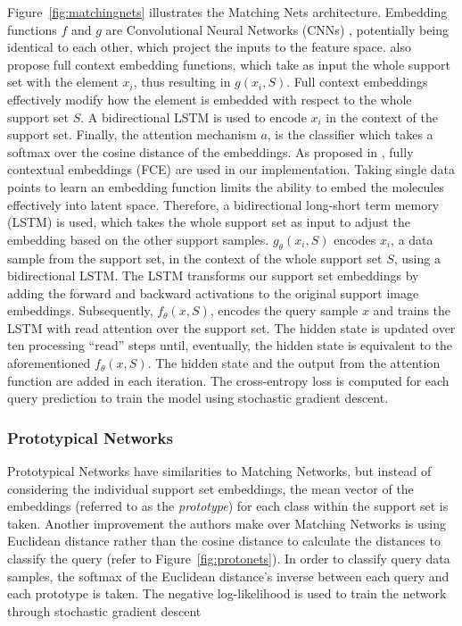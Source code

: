 Figure~\ref{fig:matchingnets} illustrates the Matching Nets architecture. Embedding functions $f$ and $g$ are Convolutional Neural Networks (CNNs) \citep{lecun1995convolutional}, potentially being identical to each other, which project the inputs to the feature space. \citet{vinyals2016matching} also propose full context embedding functions, which take as input the whole support set with the element $x_i$, thus resulting in \( g(x_i, S) \). Full context embeddings effectively modify how the element is embedded with respect to the whole support set $S$. A bidirectional LSTM is used to encode $x_i$ in the context of the support set. Finally, the attention mechanism $a$, is the classifier which takes a softmax over the cosine distance of the embeddings. As proposed in \citet{vinyals2016matching}, fully contextual embeddings (FCE) are used in our implementation. Taking single data points to learn an embedding function limits the ability to embed the molecules effectively into latent space. Therefore, a bidirectional long-short term memory (LSTM) is used, which takes the whole support set as input to adjust the embedding based on the other support samples. $g_\theta(x_i, S)$ encodes $x_i$, a data sample from the support set, in the context of the whole support set $S$, using a bidirectional LSTM. The LSTM transforms our support set embeddings by adding the forward and backward activations to the original support image embeddings. Subsequently, $f_\theta(x, S)$, encodes the query sample $x$ and trains the LSTM with read attention over the support set. The hidden state is updated over ten processing ``read'' steps until, eventually, the hidden state is equivalent to the aforementioned $f_\theta(x, S)$. The hidden state and the output from the attention function are added in each iteration. The cross-entropy loss is computed for each query prediction to train the model using stochastic gradient descent.

\subsubsection{Prototypical Networks}

Prototypical Networks \citep{snell2017prototypical} have similarities to Matching Networks, but instead of considering the individual support set embeddings, the mean vector of the embeddings (referred to as the \textit{prototype}) for each class within the support set is taken. Another improvement the authors make over Matching Networks is using Euclidean distance rather than the cosine distance to calculate the distances to classify the query (refer to Figure~\ref{fig:protonets}). In order to classify query data samples, the softmax of the Euclidean distance's inverse between each query and each prototype is taken. The negative log-likelihood is used to train the network through stochastic gradient descent

